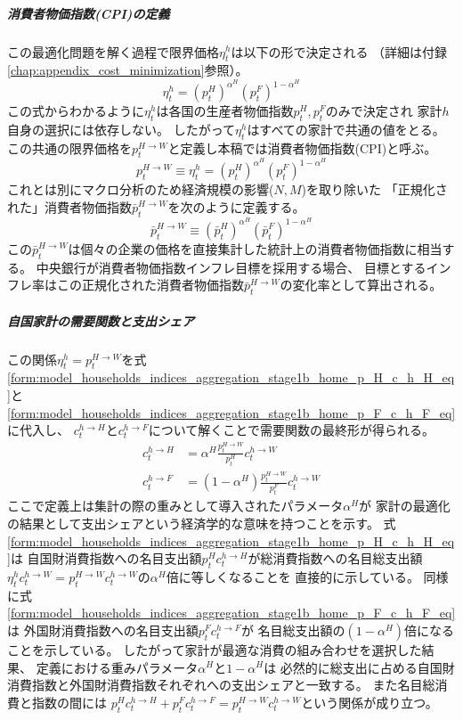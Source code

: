 \subparagraph{消費者物価指数(CPI)の定義}
この最適化問題を解く過程で限界価格\(\eta_t^h\)は以下の形で決定される
（詳細は付録\ref{chap:appendix_cost_minimization}参照）。
\begin{equation}
\label{form:model_households_indices_aggregation_stage1b_home_eta_h_eq}
    \eta_t^h=(p_t^H)^{\alpha^H}(p_t^F)^{1-\alpha^H}
\end{equation}
この式からわかるように\(\eta_t^h\)は各国の生産者物価指数\(p_t^H,p_t^F\)のみで決定され
家計\(h\)自身の選択には依存しない。
したがって\(\eta_t^h\)はすべての家計で共通の値をとる。
この共通の限界価格を\(p_t^{H\to W}\)と定義し本稿では消費者物価指数(CPI)と呼ぶ。
\begin{equation}
\label{form:model_households_indices_aggregation_stage1b_home_p_H_W_def}
    p_t^{H\to W}\equiv\eta_t^h=(p_t^H)^{\alpha^H}(p_t^F)^{1-\alpha^H}
\end{equation}
これとは別にマクロ分析のため経済規模の影響(\(N,M\))を取り除いた
「正規化された」消費者物価指数\(\bar{p}_t^{H\to W}\)を次のように定義する。
\begin{equation}
\label{form:model_households_indices_aggregation_stage1b_home_p_H_W_bar_def}
    \bar{p}_t^{H\to W}\equiv(\bar{p}_t^H)^{\alpha^H}(\bar{p}_t^F)^{1-\alpha^H}
\end{equation}
この\(\bar{p}_t^{H\to W}\)は個々の企業の価格を直接集計した統計上の消費者物価指数に相当する。
中央銀行が消費者物価指数インフレ目標を採用する場合、
目標とするインフレ率はこの正規化された消費者物価指数\(\bar{p}_t^{H\to W}\)の変化率として算出される。

\subparagraph{自国家計の需要関数と支出シェア}
この関係\(\eta_t^h=p_t^{H\to W}\)を式
\eqref{form:model_households_indices_aggregation_stage1b_home_p_H_c_h_H_eq}と
\eqref{form:model_households_indices_aggregation_stage1b_home_p_F_c_h_F_eq}に代入し、
\(c_t^{h\to H}\)と\(c_t^{h\to F}\)について解くことで需要関数の最終形が得られる。
\begin{align}
    \label{form:model_households_indices_aggregation_stage1b_home_c_h_H_eq}
        c_t^{h\to H}&=\alpha^H\frac{p_t^{H\to W}}{p_t^H}c_t^{h\to W} \\
    \label{form:model_households_indices_aggregation_stage1b_home_c_h_F_eq}
        c_t^{h\to F}&=(1-\alpha^H)\frac{p_t^{H\to W}}{p_t^F}c_t^{h\to W}
\end{align}
ここで定義上は集計の際の重みとして導入されたパラメータ\(\alpha^H\)が
家計の最適化の結果として支出シェアという経済学的な意味を持つことを示す。
式\eqref{form:model_households_indices_aggregation_stage1b_home_p_H_c_h_H_eq}は
自国財消費指数への名目支出額\(p_t^Hc_t^{h\to H}\)が総消費指数への名目総支出額
\(\eta_t^hc_t^{h\to W}=p_t^{H\to W}c_t^{h\to W}\)の\(\alpha^H\)倍に等しくなることを
直接的に示している。
同様に式\eqref{form:model_households_indices_aggregation_stage1b_home_p_F_c_h_F_eq}は
外国財消費指数への名目支出額\(p_t^Fc_t^{h\to F}\)が
名目総支出額の\((1-\alpha^H)\)倍になることを示している。
したがって家計が最適な消費の組み合わせを選択した結果、
定義における重みパラメータ\(\alpha^H\)と\(1-\alpha^H\)は
必然的に総支出に占める自国財消費指数と外国財消費指数それぞれへの支出シェアと一致する。
また名目総消費と指数の間には
\(p_t^Hc_t^{h\to H}+p_t^Fc_t^{h\to F}=p_t^{H\to W}c_t^{h\to W}\)という関係が成り立つ。

